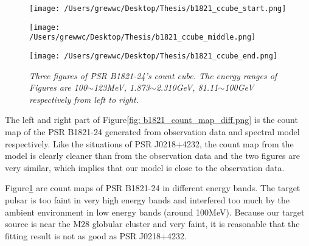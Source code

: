 \documentclass[12pt]{report}
\newcommand{\mycaption}[1]{\caption{\textit{\footnotesize #1}}}
\begin{document}
              \begin{figure}[!ht]
                \begin{center}
                \begin{minipage}{0.32\textwidth}
                  \begin{center} 
                    \texttt{[image: /Users/grewwc/Desktop/Thesis/b1821\_ccube\_start.png]}
                  \end{center}
                \end{minipage}
                \begin{minipage}{0.32\textwidth}
                  \begin{center}
                    \texttt{[image: /Users/grewwc/Desktop/Thesis/b1821\_ccube\_middle.png]}
                  \end{center}
                \end{minipage}
                \begin{minipage}{0.32\textwidth}
                  \begin{center}
                  \texttt{[image: /Users/grewwc/Desktop/Thesis/b1821\_ccube\_end.png]}
                  \end{center}
                \end{minipage}
              \end{center}
              \mycaption{Three figures of PSR B1821-24's count cube. The energy ranges of Figures are  
                100$\sim$123MeV, 1.873$\sim$2.310GeV, 81.11$\sim$100GeV respectively from left to right.}
              \label{fig: b1821_ccube_1_15_33.png}
              \end{figure}

              The left and right part of Figure\ref{fig: b1821_count_map_diff.png} is the count 
              map of the PSR B1821-24 generated from observation data and spectral model respectively. 
              Like the situations of PSR J0218+4232, the count map from the model is clearly cleaner than 
              from the observation data and the two figures are very similar, which implies that our model 
              is close to the observation data. 

              Figure\ref{fig: b1821_ccube_1_15_33.png} are count maps of PSR B1821-24 in different energy 
              bands. The target pulsar is too faint in very high energy bands and interfered too much by the ambient 
              environment in low energy bands (around 100MeV). Because our target source is near the M28 globular 
              cluster and very faint, it is reasonable that the fitting result is not as good as PSR J0218+4232. 
\end{document}
